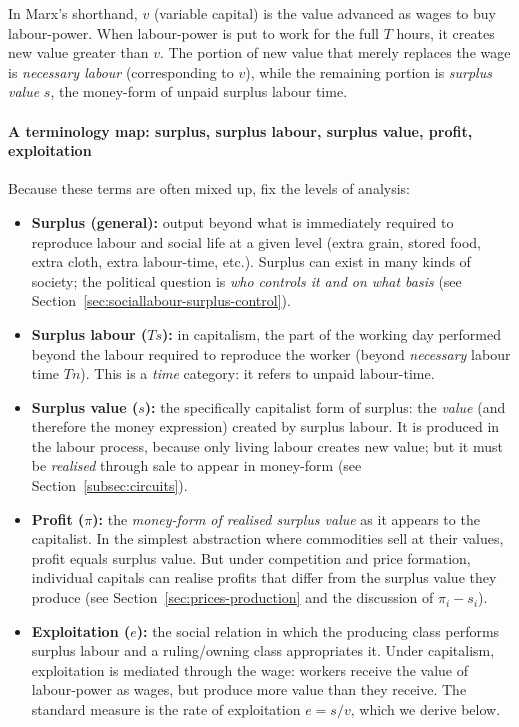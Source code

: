 In Marx’s shorthand, $v$ (variable capital) is the value advanced as wages to buy
labour-power. When labour-power is put to work for the full $T$ hours, it creates new
value greater than $v$. The portion of new value that merely replaces the wage is
\emph{necessary labour} (corresponding to $v$), while the remaining portion is
\emph{surplus value} $s$, the money-form of unpaid surplus labour time.

\paragraph{A terminology map: surplus, surplus labour, surplus value, profit, exploitation}
\label{sec:terms-surplus-profit}

Because these terms are often mixed up, fix the levels of analysis:

\begin{itemize}[leftmargin=1.5em]
  \item \textbf{Surplus (general):} output beyond what is immediately required to reproduce labour and social life
  at a given level (extra grain, stored food, extra cloth, extra labour-time, etc.). Surplus can exist in many
  kinds of society; the political question is \emph{who controls it and on what basis} (see Section~\ref{sec:sociallabour-surplus-control}). 

  \item \textbf{Surplus labour (\(Ts\)):} in capitalism, the part of the working day performed beyond the labour
  required to reproduce the worker (beyond \emph{necessary} labour time \(Tn\)). This is a \emph{time} category:
  it refers to unpaid labour-time.

  \item \textbf{Surplus value (\(s\)):} the specifically capitalist form of surplus: the \emph{value} (and therefore
  the money expression) created by surplus labour. It is produced in the labour process, because only living labour
  creates new value; but it must be \emph{realised} through sale to appear in money-form (see Section~\ref{subsec:circuits}).

  \item \textbf{Profit (\(\pi\)):} the \emph{money-form of realised surplus value} as it appears to the capitalist.
  In the simplest abstraction where commodities sell at their values, profit equals surplus value. But under
  competition and price formation, individual capitals can realise profits that differ from the surplus value they
  produce (see Section~\ref{sec:prices-production} and the discussion of \(\pi_i - s_i\)).

  \item \textbf{Exploitation (\(e\)):} the social relation in which the producing class performs surplus labour and a
  ruling/owning class appropriates it. Under capitalism, exploitation is mediated through the wage: workers receive
  the value of labour-power as wages, but produce more value than they receive. The standard measure is the rate of
  exploitation \(e = s/v\), which we derive below.
\end{itemize}

